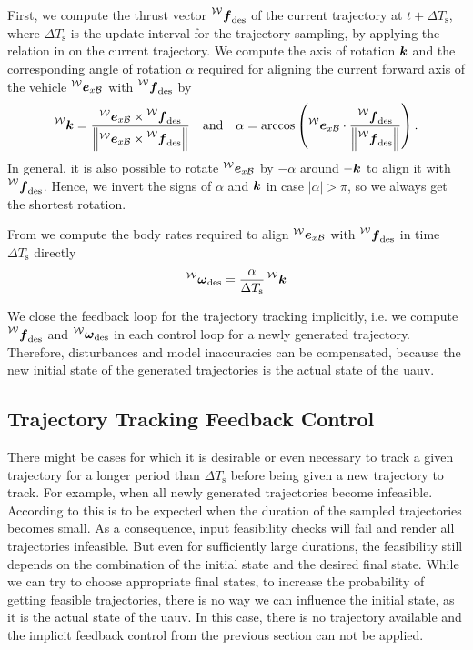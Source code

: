 First, we compute the thrust vector $\thrustdesiredworld$ of the current trajectory at $t+\Delta T_\text{s}$, where $\Delta T_{\text{s}}$ is the update interval for the trajectory sampling, by applying the relation in  on the current trajectory.
We compute the axis of rotation $\mbox{$\bm{k}$}$ and the corresponding angle of rotation $\alpha$ required for aligning the current forward axis of the vehicle $\prescript{\mathcal{W}}{}{\mbox{$\bm{e}$}}_{x\mathcal{B}}$ with $\thrustdesiredworld$ by
\begin{equation}
	\label{eq:rotation-to-desired-thrust-vector}
	\rotationaxisworld = \frac{
		\exbodyinworld \times \thrustdesiredworld
	}{
		\left\lVert
			\exbodyinworld \times \thrustdesiredworld
		\right\rVert}
	\quad
	\text{and}
	\quad
	\alpha = \arccos\left(
		\exbodyinworld \cdot
		\frac{\thrustdesiredworld}{\left\lVert\thrustdesiredworld\right\rVert}
	\right)
	.
\end{equation}
In general, it is also possible to rotate $\prescript{\mathcal{W}}{}{\mbox{$\bm{e}$}}_{x\mathcal{B}}$ by $-\alpha$ around $-\mbox{$\bm{k}$}$ to align it with $\thrustdesiredworld$. Hence, we invert the signs of $\alpha$ and $\mbox{$\bm{k}$}$ in case $\lvert\alpha\rvert > \pi$, so we always get the shortest rotation. %

From  we compute the body rates required to align $\prescript{\mathcal{W}}{}{\mbox{$\bm{e}$}}_{x\mathcal{B}}$ with $\thrustdesiredworld$ in time $\Delta T_{\text{s}}$ directly
\begin{equation}
	\vangdesiredworld = \frac{\alpha}{\Delta T_{\text{s}}} \rotationaxisworld
\end{equation}

We close the feedback loop for the trajectory tracking implicitly, i.e. we compute $\thrustdesiredworld$ and $\vangdesiredworld$ in each control loop for a newly generated trajectory.
Therefore, disturbances and model inaccuracies can be compensated, because the new initial state of the generated trajectories is the actual state of the \ac{uauv}.

\subsection{Trajectory Tracking Feedback Control}
\label{sec:closed-loop-tracking}
There might be cases for which it is desirable or even necessary to track a given trajectory for a longer period than $\Delta T_{\text{s}}$ before being given a new trajectory to track.
For example, when all newly generated trajectories become infeasible. According to \cite{MuellerHehn15} this is to be expected when the duration of the sampled trajectories becomes small.
As a consequence, input feasibility checks will fail and render all trajectories infeasible.
But even for sufficiently large durations, the feasibility still depends on the combination of the initial state and the desired final state.
While we can try to choose appropriate final states, to increase the probability of getting feasible trajectories, there is no way we can influence the initial state, as it is the actual state of the \ac{uauv}.
In this case, there is no trajectory available and the implicit feedback control from the previous section can not be applied.

